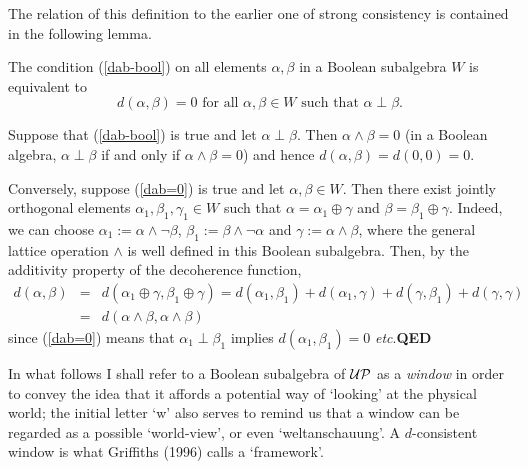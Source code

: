\documentclass[12pt]{article}
\newcounter{def-number}[section]
\newcommand{\beq}{\begin{equation}}
\newcommand{\eeq}{\end{equation}}
\newcommand{\beqa}{\begin{eqnarray}}
\newcommand{\eeqa}{\end{eqnarray}}
\newcommand{\eq}[1]{(\ref{#1})}
\newcommand\lemma{\smallskip\noindent{\em Lemma\ \ }\nopagebreak}
\newcommand\proof{\noindent{\em Proof\ \ }\nopagebreak}
\newcommand\eproof{\hfill{\bf QED}\medskip}
\renewcommand{\a}{\alpha}                   %
\renewcommand{\b}{\beta}                    %
\newcommand{\g}{\gamma}
\newcommand{\UP}{{\cal UP}}
\begin{document}
	The relation of this definition to the earlier one of strong
consistency is contained in the following lemma.  

\lemma The condition \eq{dab-bool} on all elements $\a,\b$ in a Boolean
subalgebra $W$ is equivalent to 
\beq
		d(\a,\b)=0\mbox{ for all }\a,\b\in W\mbox{ such that }
						\a\perp\b.			\label{dab=0}
\eeq

\proof Suppose that \eq{dab-bool} is true and let $\a\perp\b$. Then
$\a\land\b=0$ (in a Boolean algebra, $\a\perp\b$ if and only if
$\a\land\b=0$) and hence $d(\a,\b)=d(0,0)=0$.

	Conversely, suppose \eq{dab=0} is true and let $\a,\b\in W$. Then
there exist jointly orthogonal elements $\a_1,\b_1,\g_1\in W$ such
that $\a=\a_1\oplus\g$ and $\b=\b_1\oplus\g$. Indeed, we can choose
$\a_1:=\a\land\neg\b$, $\b_1:=\b\land\neg\a$ and $\g:=\a\land\b$,
where the general lattice operation $\land$ is well defined in this
Boolean subalgebra. Then, by the additivity property of the
decoherence function,
\beqa
	d(\a,\b)&=& d(\a_1\oplus\g,\b_1\oplus\g)=d(\a_1,\b_1) +
				d(\a_1,\g)+d(\g,\b_1)+d(\g,\g)		\nonumber\\
			&=&d(\a\land\b,\a\land\b)
\eeqa
since \eq{dab=0} means that $\a_1\perp\b_1$ implies
$d(\a_1,\b_1)=0$ {\em etc}.\eproof

	In what follows I shall refer to a Boolean subalgebra of $\UP$
as a {\em window\/} in order to convey the idea that it affords a
potential way of `looking' at the physical world; the initial letter
`w' also serves to remind us that a window can be regarded as a
possible `world-view', or even `weltanschauung'. A $d$-consistent
window is what Griffiths (1996) calls a `framework'.
\end{document}
